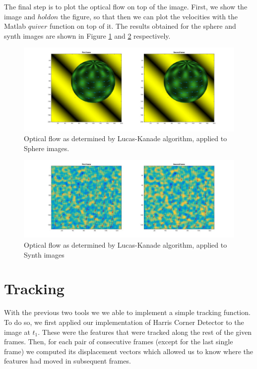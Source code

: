 \documentclass[11pt]{article}
\begin{document}
The final step is to plot the optical flow on top of the image. First, we
show the image and $hold on$ the figure, so that then we can plot the velocities
with the Matlab $quiver$ function on top of it. The results obtained for the
sphere and synth images are shown in Figure \ref{fig:sphere_lucas} and
\ref{fig:synth_lucas} respectively.


\begin{figure}[H] \centering
	\includegraphics[width=1\textwidth]{imgs/sphere.jpg}
	\caption{Optical flow as determined by Lucas-Kanade algorithm, applied to Sphere images.}
	\label{fig:sphere_lucas}
\end{figure}

\begin{figure}[H] \centering
	\includegraphics[width=1\textwidth]{imgs/synth.jpg}
	\caption{Optical flow as determined by Lucas-Kanade algorithm, applied to Synth images}
	\label{fig:synth_lucas}
\end{figure}


\section{Tracking}
With the previous two tools we we able to implement a simple tracking function.
To do so, we first applied our implementation of Harris Corner Detector to the
image at $t_1$. These were the features that were tracked along the rest of the
given frames.  Then, for each pair of consecutive frames (except for the last
single frame) we computed its displacement vectors which allowed us to know
where the features had moved in subsequent frames. 
\end{document}
